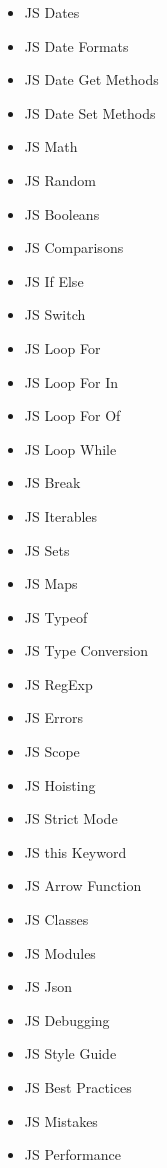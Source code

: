 \documentclass[12pt, letterpaper]{article}
\begin{document}
\begin{enumerate}
\begin{itemize}
\begin{enumerate}
\begin{itemize}
                \item JS Dates
                \item JS Date Formats
                \item JS Date Get Methods
                \item JS Date Set Methods
                \item JS Math
                \item JS Random
                \item JS Booleans
                \item JS Comparisons
                \item JS If Else
                \item JS Switch
                \item JS Loop For
                \item JS Loop For In
                \item JS Loop For Of
                \item JS Loop While
                \item JS Break
                \item JS Iterables
                \item JS Sets
                \item JS Maps
                \item JS Typeof
                \item JS Type Conversion
                \item JS RegExp
                \item JS Errors
                \item JS Scope
                \item JS Hoisting
                \item JS Strict Mode
                \item JS this Keyword
                \item JS Arrow Function
                \item JS Classes
                \item JS Modules
                \item JS Json
                \item JS Debugging
                \item JS Style Guide
                \item JS Best Practices
                \item JS Mistakes
                \item JS Performance

\end{itemize}
\end{enumerate}
\end{itemize}
\end{enumerate}
\end{document}
